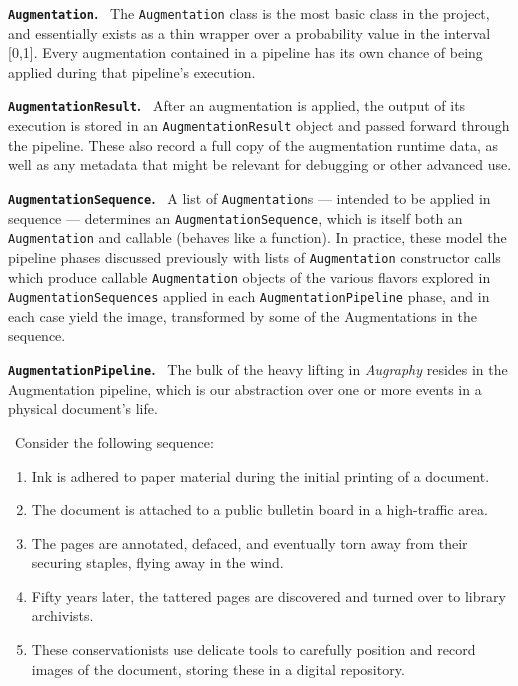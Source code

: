\documentclass[runningheads]{llncs}
\begin{document}
\smallskip
\noindent\textbf{\texttt{Augmentation}.} ~The \texttt{Augmentation} class is the most basic class in the project, and essentially exists as a thin wrapper over a probability value in the interval [0,1].
Every augmentation contained in a pipeline has its own chance of being applied during that pipeline's execution.

\smallskip
\noindent\textbf{\texttt{AugmentationResult}.} ~After an augmentation is applied, the output of its execution is stored in an \texttt{AugmentationResult} object and passed forward through the pipeline.
These also record a full copy of the augmentation runtime data, as well as any metadata that might be relevant for debugging or other advanced use.

\smallskip
\noindent\textbf{\texttt{AugmentationSequence}.} ~A list of \texttt{Augmentation}s --- intended to be applied in sequence --- determines an \texttt{AugmentationSequence}, which is itself both an \texttt{Augmentation} and callable (behaves like a function).
In practice, these model the pipeline phases discussed previously with lists of \texttt{Augmentation} constructor calls which produce callable \texttt{Augmentation} objects of the various flavors explored in \texttt{AugmentationSequences} applied in each \texttt{AugmentationPipeline} phase, and in each case yield the image, transformed by some of the Augmentations in the sequence.

\smallskip
\noindent\textbf{\texttt{AugmentationPipeline}.} ~The bulk of the heavy lifting in \emph{Augraphy} resides in the Augmentation pipeline, which is our abstraction over one or more events in a physical document's life.

\smallskip
\noindent~Consider the following sequence:
\begin{enumerate}[leftmargin=4em]
  \item Ink is adhered to paper material during the initial printing of a document.
  \item The document is attached to a public bulletin board in a high-traffic area.
  \item The pages are annotated, defaced, and eventually torn away from their securing staples, flying away in the wind.
  \item Fifty years later, the tattered pages are discovered and turned over to library archivists.
  \item These conservationists use delicate tools to carefully position and record images of the document, storing these in a digital repository.
\end{enumerate}
\end{document}
